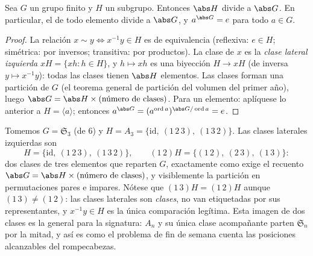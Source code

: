 \begin{theorem}[Lagrange]\label{thm:b2:structures:lagrange}
Sea $G$ un grupo finito y $H$ un subgrupo. Entonces $\abs H$ divide a
$\abs G$. En particular, el  de todo
elemento divide a $\abs G$, y $a^{\abs G} = e$ para todo $a \in G$.
\end{theorem}

\begin{proof}
La relación $x \sim y \iff x^{-1}y \in H$ es de equivalencia
(reflexiva: $e \in H$; simétrica: por inversos; transitiva: por
productos). La clase de $x$ es la \emph{clase lateral izquierda} $xH
= \{xh : h \in H\}$, y $h \mapsto xh$ es una biyección $H \to xH$ (de
inversa $y \mapsto x^{-1}y$): todas las clases tienen $\abs H$
elementos. Las clases forman una partición de $G$ (el teorema general
de partición del volumen del primer año), luego $\abs G = \abs H
\times (\text{número de clases})$. Para un elemento: aplíquese lo
anterior a $H = \langle a\rangle$; entonces $a^{\abs G} =
(a^{\operatorname{ord} a})^{\abs G / \operatorname{ord} a} = e$.
\end{proof}

\begin{example}\label{ex:b2:structures:cosets}
Tomemos $G = \mathfrak{S}_3$ (de  $6$) y $H = A_3 =
\{\mathrm{id},\ (1\,2\,3),\ (1\,3\,2)\}$. Las clases laterales
izquierdas son
\[
H = \{\mathrm{id},\ (1\,2\,3),\ (1\,3\,2)\},
\qquad
(1\,2)H = \{(1\,2),\ (2\,3),\ (1\,3)\} :
\]
dos clases de tres elementos que reparten $G$, exactamente como
exige el recuento $\abs G = \abs H \times (\text{número de
clases})$, y visiblemente la partición en permutaciones pares e
impares. Nótese que $(1\,3)H = (1\,2)H$ aunque $(1\,3) \neq
(1\,2)$: las clases laterales son \emph{clases}, no van
etiquetadas por sus representantes, y $x^{-1}y \in H$ es la única
comparación legítima. Esta imagen de dos clases es la general para
la signatura: $A_n$ y su única clase acompañante parten
$\mathfrak{S}_n$ por la mitad, y así es como el problema de fin de
semana cuenta las posiciones alcanzables del rompecabezas.
\end{example}

